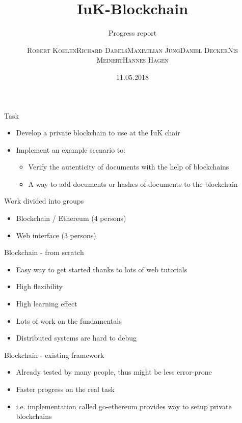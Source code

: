 \documentclass[10pt]{beamer}
\title{IuK-Blockchain}
\subtitle{Progress report}
\author{\textsc{Robert Kohlen}\newline\textsc{Richard Dabels}\newline\textsc{Maximilian Jung}\newline\textsc{Daniel Decker}\newline\textsc{Nis Meinert}\newline\textsc{Hannes Hagen}}
\date{11.05.2018}
\begin{document}
\begin{frame}
	\titlepage
\end{frame}

\begin{frame}{Task}
	\begin{itemize}
		\item Develop a private blockchain to use at the IuK chair
		\item Implement an example scenario to:
		\begin{itemize}
			\item Verify the autenticity of documents with the help of blockchains
			\item A way to add documents or hashes of documents to the blockchain
		\end{itemize}
	\end{itemize}
\end{frame}

\begin{frame}{Work divided into groups}
	\begin{itemize}
		\item Blockchain / Ethereum (4 persons)
		\item Web interface (3 persons)
	\end{itemize}
\end{frame}

\begin{frame}{Blockchain - from scratch}
	\begin{itemize}
		\item Easy way to get started thanks to lots of web tutorials
		\item High flexibility
		\item High learning effect
		\item Lots of work on the fundamentals
		\item Distributed systems are hard to debug
	\end{itemize}
\end{frame}

\begin{frame}{Blockchain - existing framework}
	\begin{itemize}
		\item Already tested by many people, thus might be less error-prone
		\item Faster progress on the real task
		\item i.e. implementation called go-ethereum provides way to setup private blockchains
	\end{itemize}
\end{frame}
\end{document}
